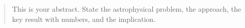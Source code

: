 \begin{abstract}
This is your abstract. State the astrophysical problem, the approach, the key result with numbers, and the implication.
\end{abstract}

